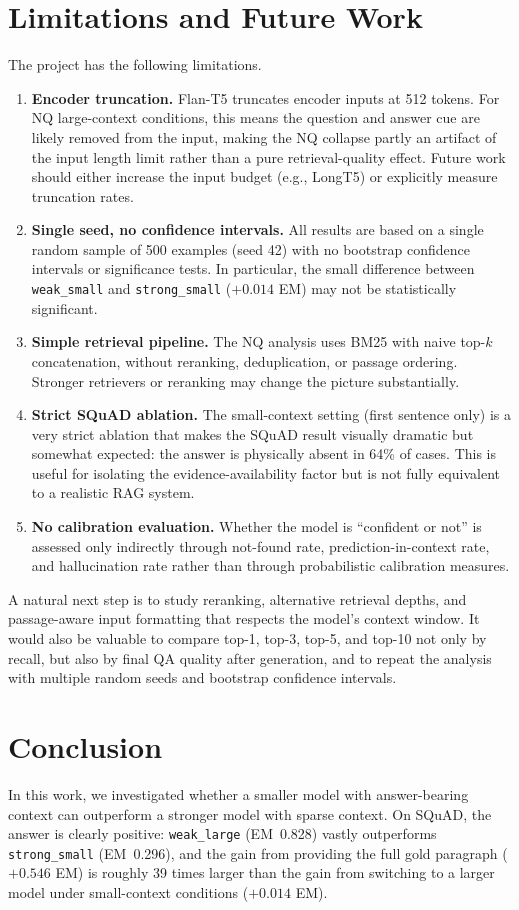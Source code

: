 \documentclass[a4paper,12pt]{article}
\begin{document}
\section{Limitations and Future Work}
The project has the following limitations.
\begin{enumerate}
    \item \textbf{Encoder truncation.} Flan-T5 truncates encoder inputs at 512 tokens. For NQ large-context conditions, this means the question and answer cue are likely removed from the input, making the NQ collapse partly an artifact of the input length limit rather than a pure retrieval-quality effect. Future work should either increase the input budget (e.g., LongT5) or explicitly measure truncation rates.
    \item \textbf{Single seed, no confidence intervals.} All results are based on a single random sample of 500 examples (seed 42) with no bootstrap confidence intervals or significance tests. In particular, the small difference between \texttt{weak\_small} and \texttt{strong\_small} ($+0.014$ EM) may not be statistically significant.
    \item \textbf{Simple retrieval pipeline.} The NQ analysis uses BM25 with naive top-$k$ concatenation, without reranking, deduplication, or passage ordering. Stronger retrievers or reranking may change the picture substantially.
    \item \textbf{Strict SQuAD ablation.} The small-context setting (first sentence only) is a very strict ablation that makes the SQuAD result visually dramatic but somewhat expected: the answer is physically absent in 64\% of cases. This is useful for isolating the evidence-availability factor but is not fully equivalent to a realistic RAG system.
    \item \textbf{No calibration evaluation.} Whether the model is ``confident or not'' is assessed only indirectly through not-found rate, prediction-in-context rate, and hallucination rate rather than through probabilistic calibration measures.
\end{enumerate}
A natural next step is to study reranking, alternative retrieval depths, and passage-aware input formatting that respects the model's context window. It would also be valuable to compare top-1, top-3, top-5, and top-10 not only by recall, but also by final QA quality after generation, and to repeat the analysis with multiple random seeds and bootstrap confidence intervals.

\section{Conclusion}
In this work, we investigated whether a smaller model with answer-bearing context can outperform a stronger model with sparse context. On SQuAD, the answer is clearly positive: \texttt{weak\_large} (EM~0.828) vastly outperforms \texttt{strong\_small} (EM~0.296), and the gain from providing the full gold paragraph ($+0.546$ EM) is roughly 39 times larger than the gain from switching to a larger model under small-context conditions ($+0.014$ EM).
\end{document}

